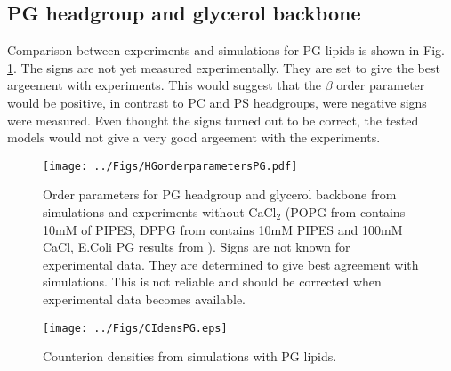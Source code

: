\documentclass[aps,prl,superscriptaddress,twocolumn]{revtex4}
\begin{document}
\subsection{PG headgroup and glycerol backbone}
Comparison between experiments and simulations for PG lipids is shown
in Fig. \ref{HGorderParametersPOPG}. The signs are not yet measured
experimentally. They are set to give the best argeement with experiments.
This would suggest that the $\beta$ order parameter would be positive,
in contrast to PC and PS headgroups, were negative signs were measured.
Even thought the signs turned out to be correct, the tested models would
not give a very good argeement with the experiments.
\begin{figure}[]
  \centering
  \texttt{[image: ../Figs/HGorderparametersPG.pdf]}
  \caption{\label{HGorderParametersPOPG}
    Order parameters for PG headgroup and glycerol backbone from simulations and experiments without CaCl$_2$ 
    (POPG from \cite{borle85} contains 10mM of PIPES, DPPG from \cite{wohlgemuth80} contains 10mM PIPES and 100mM CaCl,
    E.Coli PG results from \cite{gally81}).
    Signs are not known for experimental data. They are determined to give best agreement
    with simulations. This is not reliable and should be corrected when experimental
    data becomes available.
  }
\end{figure}

\begin{figure}[]
  \centering
  \texttt{[image: ../Figs/CIdensPG.eps]}
  \caption{\label{CIdensPG}
    Counterion densities from simulations with PG lipids.
  }
\end{figure}
\end{document}
